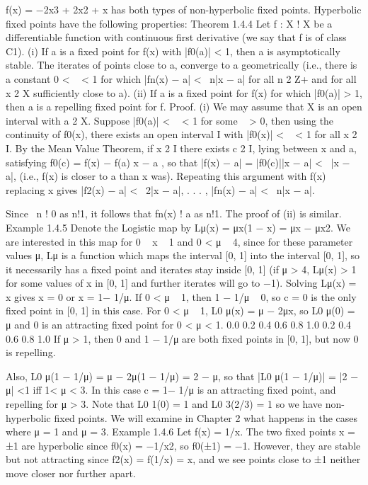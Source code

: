 \documentclass[12pt]{article}
\begin{document}
\begin{enumerate}
\begin{enumerate}
f(x) = −2x3 + 2x2 + x has both types of non-hyperbolic fixed points.
Hyperbolic fixed points have the following properties:
Theorem 1.4.4 Let f : X ! X be a differentiable function with continuous first
derivative (we say that f is of class C1).
(i) If a is a fixed point for f(x) with |f0(a)| < 1, then a is asymptotically stable.
The iterates of points close to a, converge to a geometrically (i.e., there is a constant
0 <   < 1 for which |fn(x) − a| <  n|x − a| for all n 2 Z+ and for all x 2 X
sufficiently close to a).
(ii) If a is a fixed point for f(x) for which |f0(a)| > 1, then a is a repelling fixed point
for f.
Proof. (i) We may assume that X is an open interval with a 2 X. Suppose |f0(a)| <
  < 1 for some   > 0, then using the continuity of f0(x), there exists an open interval
I with |f0(x)| <   < 1 for all x 2 I.
By the Mean Value Theorem, if x 2 I there exists c 2 I, lying between x and a,
satisfying
f0(c) =
f(x) − f(a)
x − a
,
so that
|f(x) − a| = |f0(c)||x − a| <  |x − a|,
(i.e., f(x) is closer to a than x was).
Repeating this argument with f(x) replacing x gives
|f2(x) − a| <  2|x − a|, . . . , |fn(x) − a| <  n|x − a|.

Since  n ! 0 as n!1, it follows that fn(x) ! a as n!1.
The proof of (ii) is similar.  
Example 1.4.5 Denote the Logistic map by Lμ(x) = μx(1 − x) = μx − μx2. We
are interested in this map for 0   x   1 and 0 < μ   4, since for these parameter
values μ, Lμ is a function which maps the interval [0, 1] into the interval [0, 1], so it
necessarily has a fixed point and iterates stay inside [0, 1] (if μ > 4, Lμ(x) > 1 for
some values of x in [0, 1] and further iterates will go to −1).
Solving Lμ(x) = x gives x = 0 or x = 1− 1/μ. If 0 < μ   1, then 1 − 1/μ   0, so
c = 0 is the only fixed point in [0, 1] in this case.
For 0 < μ   1, L0
μ(x) = μ − 2μx, so L0
μ(0) = μ and 0 is an attracting fixed point
for 0 < μ < 1.
0.0 0.2 0.4 0.6 0.8 1.0
0.2
0.4
0.6
0.8
1.0
If μ > 1, then 0 and 1 − 1/μ are both fixed points in [0, 1], but now 0 is repelling.

Also,
L0
μ(1 − 1/μ) = μ − 2μ(1 − 1/μ) = 2 − μ,
so that
|L0
μ(1 − 1/μ)| = |2 − μ| <1 iff 1< μ < 3.
In this case c = 1− 1/μ is an attracting fixed point, and repelling for μ > 3. Note
that L0
1(0) = 1 and L0
3(2/3) = 1 so we have non-hyperbolic fixed points.
We will examine in Chapter 2 what happens in the cases where μ = 1 and μ = 3.
Example 1.4.6 Let f(x) = 1/x. The two fixed points x = ±1 are hyperbolic since
f0(x) = −1/x2, so f0(±1) = −1. However, they are stable but not attracting since
f2(x) = f(1/x) = x, and we see points close to ±1 neither move closer nor further
apart.


\end{enumerate}
\end{enumerate}
\end{document}
